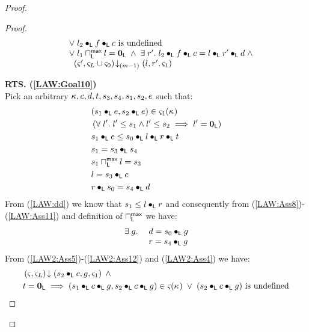 \begin{lemma}[]
\begin{proof}
\begin{proof}
\begin{align}
\begin{array}{l}
		\hspace*{0.4cm}\lor\;l_2 \bullet_{\textsf{L}} f \bullet_{\textsf{L}} c \text{ is undefined}\\
		\hspace*{0.4cm}\lor\; l_1 \sqcap_{\textsf{L}}^{\textsf{max}} l = \mathbf{0}_{\textsf{L}} \;\land\; \exists\; r'.\; l_2 \bullet_{\textsf{L}} f \bullet_{\textsf{L}} c = l \bullet_{\textsf{L}} r' \bullet_{\textsf{L}} d \;\land\\
		\hspace*{0.6cm} \left(\varsigma_{}', \varsigma_{L} \cup \varsigma_{0}\right) \!\downarrow_{(m-1)} \left(l, r', \varsigma_{1}\right)
	\end{array} \label{LAW:Goal11}
\end{align}
%

\noindent\textbf{RTS. (\ref{LAW:Goal10})} \\
Pick an arbitrary $\kappa_{}, c, d, t, s_3, s_4, s_1, s_2, e$ such that:
%
\begin{align}
	& (s_1 \bullet_{\textsf{L}} e, s_2 \bullet_{\textsf{L}} e) \in \varsigma_{1}(\kappa_{}) \label{LAW2:Ass5} \\
	& \left(\forall\; l'.\; l' \leq s_1 \land l' \leq s_2 \implies l' = \mathbf{0}_{\textsf{L}}\right) \label{LAW:Ass6}\\
	& s_1 \bullet_{\textsf{L}} e \leq  s_0 \bullet_{\textsf{L}} l \bullet_{\textsf{L}} r \bullet_{\textsf{L}} t\label{LAW2:Ass7}\\
	& s_1 = s_3 \bullet_{\textsf{L}} s_4 \label{LAW2:Ass8}\\
	& s_1 \sqcap_{\textsf{L}}^{\textsf{max}} l = s_3 \label{LAW2:Ass9}\\
	& l = s_3 \bullet_{\textsf{L}} c \label{LAW2:Ass10}\\
	& r \bullet_{\textsf{L}} s_0 = s_4 \bullet_{\textsf{L}} d \label{LAW2:Ass11}
\end{align}
From (\ref{LAW:dd}) we know that $s_1 \leq l \bullet_{\textsf{L}} r$ and consequently from (\ref{LAW:Ass8})-(\ref{LAW:Ass11}) and definition of $\sqcap_{\textsf{L}}^{\textsf{max}}$ we have:
%
\begin{align}
\begin{array}{l l}
	\exists\; g.\; & d = s_0 \bullet_{\textsf{L}} g \\
	& r = s_4 \bullet_{\textsf{L}} g
\end{array} \label{LAW2:Ass12}
\end{align}
From (\ref{LAW2:Ass5})-(\ref{LAW2:Ass12}) and (\ref{LAW2:Ass4}) we have:
%
\begin{align}
	&\left(\varsigma_{}, \varsigma_{L}\right) \!\downarrow \left(s_2 \bullet_{\textsf{L}} c, g, \varsigma_{1}\right) \;\land \nonumber\\
	&t = \mathbf{0}_{\textsf{L}} \implies (s_1 \bullet_{\textsf{L}} c \bullet_{\textsf{L}} g, s_2 \bullet_{\textsf{L}} c \bullet_{\textsf{L}} g) \in \varsigma_{}(\kappa_{}) \;\lor\; (s_2 \bullet_{\textsf{L}} c \bullet_{\textsf{L}} g) \text{ is undefined} \label{LAW2:Assmid}
\end{align}

\end{proof}
\end{proof}
\end{lemma}
